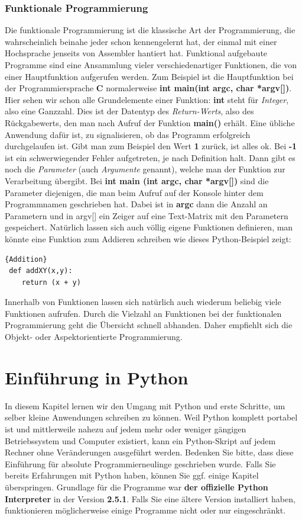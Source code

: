 \documentclass[b5paper,10pt,dvips,fleqn,titlepage,twoside]{book}
\begin{document}
\subsection{Funktionale Programmierung}
Die funktionale Programmierung ist die klassische Art  der Programmierung, die wahrscheinlich beinahe jeder schon kennengelernt hat, der einmal mit einer Hochsprache jenseits von Assembler hantiert hat.
Funktional aufgebaute Programme sind eine Ansammlung vieler verschiedenartiger Funktionen, die von einer Hauptfunktion aufgerufen werden.
Zum Beispiel ist die Hauptfunktion bei der Programmiersprache \textbf{C} normalerweise \textbf{int main(int argc, char *argv[])}. Hier sehen wir schon alle Grundelemente einer Funktion: \textbf{int} steht für \emph{Integer}, also eine Ganzzahl. Dies ist der Datentyp des \emph{Return-Werts}, also des  Rückgabewerts, den man nach Aufruf der Funktion \textbf{main()} erhält. Eine übliche Anwendung dafür ist, zu signalisieren, ob das Programm erfolgreich durchgelaufen ist. Gibt man zum Beispiel den Wert \textbf{1} zurück, ist alles ok. Bei \textbf{-1} ist ein schwerwiegender Fehler aufgetreten, je nach Definition halt.\newline
Dann gibt es noch die \emph{Parameter} (auch \emph{Argumente} genannt), welche man der Funktion zur Verarbeitung übergibt.
Bei \textbf{int main (int argc, char *argv[])} sind die Parameter diejenigen, die man beim Aufruf auf der Konsole hinter dem Programmnamen geschrieben hat. Dabei ist in \textbf{argc} dann die Anzahl an Parametern und in argv[] ein Zeiger auf eine Text-Matrix mit den Parametern gespeichert.\newline
Natürlich lassen sich auch völlig eigene Funktionen definieren, man könnte eine Funktion zum Addieren schreiben wie dieses Python-Beispiel zeigt:
\begin{lstlisting}[caption=Beispielcode für Additionsfunktion]{Addition}
 def addXY(x,y):
	return (x + y)
\end{lstlisting}
Innerhalb von Funktionen lassen sich natürlich auch wiederum beliebig viele Funktionen aufrufen.
Durch die Vielzahl an Funktionen bei der funktionalen Programmierung geht die Übersicht schnell abhanden. Daher empfiehlt sich die Objekt- oder Aspektorientierte Programmierung.
\newpage
\chapter{Einführung in Python}
In diesem Kapitel lernen wir den Umgang mit Python und erste Schritte, um selber kleine Anwendungen schreiben zu können. Weil Python komplett portabel ist und mittlerweile nahezu auf jedem mehr oder weniger gängigen Betriebssystem und Computer existiert, kann ein Python-Skript auf jedem Rechner ohne Veränderungen ausgeführt werden.\newline
Bedenken Sie bitte, dass diese Einführung für absolute Programmierneulinge geschrieben wurde. Falls Sie bereits Erfahrungen mit Python haben, können Sie ggf. einige Kapitel überspringen.\newline
Grundlage für die Programme war \textbf{der offizielle Python Interpreter} in der Version \textbf{2.5.1}. Falls Sie eine ältere Version installiert haben, funktionieren möglicherweise einige Programme nicht oder nur eingeschränkt.\newpage
\end{document}
